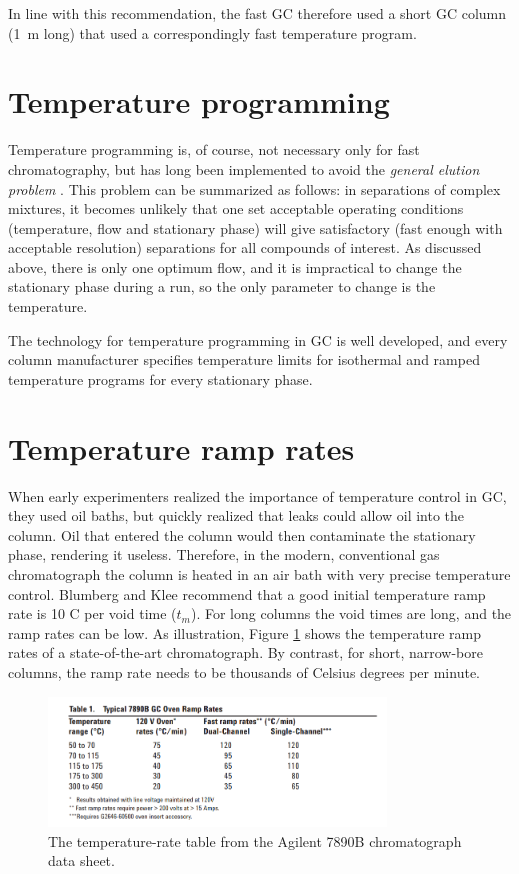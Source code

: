 In line with this recommendation, the fast GC therefore used a short GC column
(\SI{1}{\metre} long) that used a correspondingly fast temperature program.

\section{Temperature programming}

Temperature programming is, of course, not necessary only for fast
chromatography, but has long been implemented to avoid the \textit{general
elution problem} \autocite{Skoog2007}. This problem can be summarized as
follows: in separations of complex mixtures, it becomes unlikely that one set
acceptable operating conditions (temperature, flow and stationary phase) will
give satisfactory (fast enough with acceptable resolution) separations for all
compounds of interest. As discussed above, there is only one optimum flow, and
it is impractical to change the stationary phase during a run, so the only
parameter to change is the temperature.

The technology for temperature programming in GC is well developed, and every
column manufacturer specifies temperature limits for isothermal and ramped
temperature programs for every stationary phase.

\section{Temperature ramp rates}
\label{sec:RampRates}
When early experimenters realized the importance of temperature control in GC,
they used oil baths, but quickly realized that leaks could allow oil into the
column. Oil that entered the column would then contaminate the stationary phase,
rendering it useless. Therefore, in the modern, conventional gas chromatograph
the column is heated in an air bath with very precise temperature control.
Blumberg and Klee \autocite{Blumberg2000} recommend that a good initial
temperature ramp rate is 10 C\textdegree{} per void time ($t_m$). For long
columns the void times are long, and the ramp rates can be low. As illustration,
Figure \ref{fig:RampRate7890B} shows the temperature ramp rates of a
state-of-the-art chromatograph. By contrast, for short, narrow-bore columns, the
ramp rate needs to be thousands of Celsius degrees per minute.

\begin{figure}
	\centering
	\includegraphics[width=0.8\textwidth]{Figures/7890B.png}
	\decoRule
\caption[A temperature-rate table from the Agilent7890B data sheet]{The temperature-rate table from the Agilent 7890B chromatograph data sheet\autocite{7890B}. }
\label{fig:RampRate7890B}
\end{figure}


